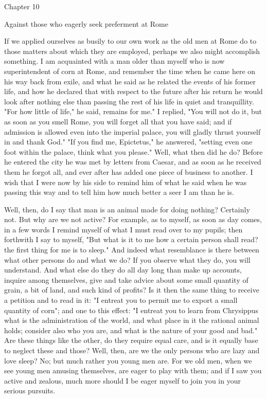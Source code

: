 \documentclass[a4paper]{article}
\begin{document}
Chapter 10

Against those who eagerly seek preferment at Rome 

If we applied ourselves as busily to our own work as the old men at
Rome do to those matters about which they are employed, perhaps we
also might accomplish something. I am acquainted with a man older
than myself who is now superintendent of corn at Rome, and remember
the time when he came here on his way back from exile, and what he
said as he related the events of his former life, and how he declared
that with respect to the future after his return he would look after
nothing else than passing the rest of his life in quiet and tranquillity.
"For how little of life," he said, remains for me." I replied, "You
will not do it, but as soon as you smell Rome, you will forget all
that you have said; and if admission is allowed even into the imperial
palace, you will gladly thrust yourself in and thank God." "If you
find me, Epictetus," he answered, "setting even one foot within the
palace, think what you please." Well, what then did he do? Before
he entered the city he was met by letters from Caesar, and as soon
as he received them he forgot all, and ever after has added one piece
of business to another. I wish that I were now by his side to remind
him of what he said when he was passing this way and to tell him how
much better a seer I am than he is. 

Well, then, do I say that man is an animal made for doing nothing?
Certainly not. But why are we not active? For example, as to myself,
as soon as day comes, in a few words I remind myself of what I must
read over to my pupils; then forthwith I say to myself, "But what
is it to me how a certain person shall read? the first thing for me
is to sleep." And indeed what resemblance is there between what other
persons do and what we do? If you observe what they do, you will understand.
And what else do they do all day long than make up accounts, inquire
among themselves, give and take advice about some small quantity of
grain, a bit of land, and such kind of profits? Is it then the same
thing to receive a petition and to read in it: "I entreat you to permit
me to export a small quantity of corn"; and one to this effect: "I
entreat you to learn from Chrysippus what is the administration of
the world, and what place in it the rational animal holds; consider
also who you are, and what is the nature of your good and bad." Are
these things like the other, do they require equal care, and is it
equally base to neglect these and those? Well, then, are we the only
persons who are lazy and love sleep? No; but much rather you young
men are. For we old men, when we see young men amusing themselves,
are eager to play with them; and if I saw you active and zealous,
much more should I be eager myself to join you in your serious pursuits.
\end{document}
